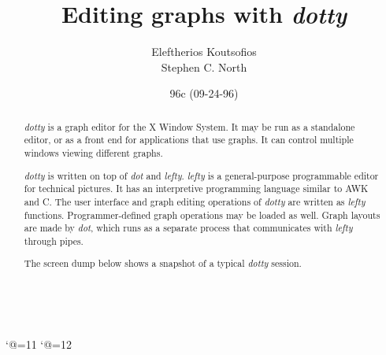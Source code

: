 

\catcode`@=11
\def\@makechapterhead#1{
    {
        \parindent \z@ \raggedright \reset@font
        \ifnum \c@secnumdepth >\m@ne
            \Large\bfseries \@chapapp{} \thechapter . #1
            \par\nobreak
            \vskip 20\p@
        \fi
        \interlinepenalty\@M
    }
}
\catcode`@=12

\newcommand{\FEY}{{\sl fey}}
\newcommand{\YEAST}{{\sl yeast}}
\newcommand{\DOT}{{\sl dot}}
\newcommand{\LEFTY}{{\sl lefty}}
\newcommand{\DOTTY}{{\sl dotty}}
\newcommand{\LDBX}{{\sl ldbx}}

\title{Editing graphs with {\DOTTY}}
\author{Eleftherios Koutsofios\\
Stephen C. North}
\newcommand{\lastedited}{96c (09-24-96)}
\date{\lastedited}

\renewcommand{\textfraction}{0.01}
\setlength\oddsidemargin{0.00pt}
\setlength\evensidemargin{0.00pt}
\setlength{\topmargin}{0pt}
\setlength{\headheight}{0pt}
\setlength{\headsep}{0pt}
\setlength{\textheight}{8.5in}
\setlength{\textwidth}{6.5in}

\maketitle
\begin{abstract}
{\DOTTY} is a graph editor for the X Window System.  It may be run as a
standalone editor, or as a front end for applications that use graphs.  It can
control multiple windows viewing different graphs.

{\DOTTY} is written on top of {\DOT} and {\LEFTY}.  {\LEFTY} is a
general-purpose programmable editor for technical pictures.  It has an
interpretive programming language similar to AWK and C.  The user interface and
graph editing operations of {\DOTTY} are written as {\LEFTY} functions.
Programmer-defined graph operations may be loaded as well.  Graph layouts are
made by {\DOT}, which runs as a separate process that communicates with
{\LEFTY} through pipes.

The screen dump below shows a snapshot of a typical {\DOTTY} session.

\vspace{0.1in}
\centerline{\hbox{\epsfxsize=6in }}
\end{abstract}


